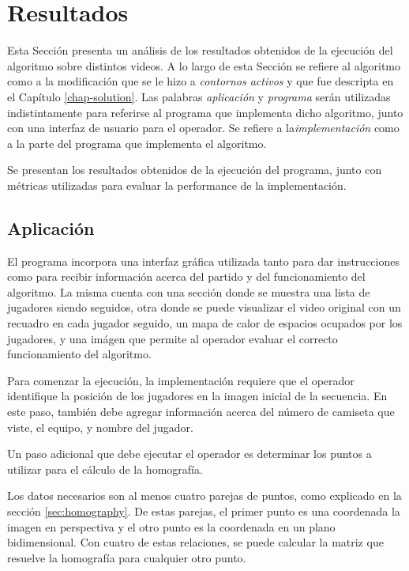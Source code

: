 \chapter{Resultados}
\label{chap-results}

Esta Sección presenta un análisis de los resultados obtenidos de la ejecución del algoritmo sobre distintos videos. A lo largo de esta Sección se refiere al algoritmo como a la modificación que se le hizo a \textit{contornos activos} y que fue descripta en el Capítulo \ref{chap-solution}. Las palabras \textit{aplicación} y \textit{programa} serán utilizadas indistintamente para referirse al programa que implementa dicho algoritmo, junto con una interfaz de usuario para el operador. Se refiere a la\textit{implementación} como a la parte del programa que implementa el algoritmo.

Se presentan los resultados obtenidos de la ejecución del programa, junto con métricas utilizadas para evaluar la performance de la implementación.

\section{Aplicación}

El programa incorpora una interfaz gráfica utilizada tanto para dar instrucciones como para recibir información acerca del partido y del funcionamiento del algoritmo. La misma cuenta con una sección donde se muestra una lista de jugadores siendo seguidos, otra donde se puede visualizar el video original con un recuadro en cada jugador seguido, un mapa de calor de espacios ocupados por los jugadores, y una imágen que permite al operador evaluar el correcto funcionamiento del algoritmo.

Para comenzar la ejecución, la implementación requiere que el operador identifique la posición de los jugadores en la imagen inicial de la secuencia. En este paso, también debe agregar información acerca del número de camiseta que viste, el equipo, y nombre del jugador.

Un paso adicional que debe ejecutar el operador es determinar los puntos a utilizar para el cálculo de la homografía.

Los datos necesarios son al menos cuatro parejas de puntos, como explicado en la sección \ref{sec:homography}. De estas parejas, el primer punto es una coordenada la imagen en perspectiva y el otro punto es la coordenada en un plano bidimensional. Con cuatro de estas relaciones, se puede calcular la matriz que resuelve la homografía para cualquier otro punto.  

